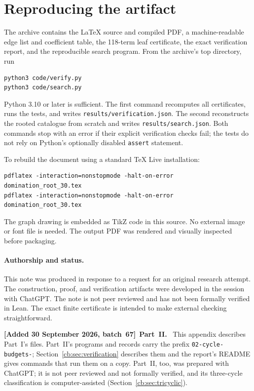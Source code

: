 \documentclass[11pt]{article}
\numberwithin{equation}{section}
\theoremstyle{definition}
\newenvironment{writenote}[1][]{\par\smallskip\begingroup\small\sloppy
 \noindent\textbf{[Added 30 September 2026, batch~67]}\if\relax\detokenize{#1}\relax\else~\textbf{#1.}\fi\ }%
 {\par\endgroup\smallskip}
\begin{document}
\appendix
\section{Reproducing the artifact}

The archive contains the \LaTeX{} source and compiled PDF, a
machine-readable edge list and coefficient table, the 118-term leaf
certificate, the exact verification report, and the reproducible
search program. From the archive's top directory, run
\begin{lstlisting}
python3 code/verify.py
python3 code/search.py
\end{lstlisting}
Python 3.10 or later is sufficient. The first command recomputes all
certificates, runs the tests, and writes
\texttt{results/verification.json}. The second reconstructs the rooted
catalogue from scratch and writes \texttt{results/search.json}.
Both commands stop with an error if their explicit verification checks
fail; the tests do not rely on Python's optionally disabled
\texttt{assert} statement.

To rebuild the document using a standard TeX Live installation:
\begin{lstlisting}
pdflatex -interaction=nonstopmode -halt-on-error domination_root_30.tex
pdflatex -interaction=nonstopmode -halt-on-error domination_root_30.tex
\end{lstlisting}
The graph drawing is embedded as TikZ code in this source. No external
image or font file is needed. The output PDF was rendered and visually
inspected before packaging.

\paragraph{Authorship and status.}
This note was produced in response to a request for an original
research attempt. The construction, proof, and verification artifacts
were developed in the session with ChatGPT. The note is not peer
reviewed and has not been formally verified in Lean. The exact finite
certificate is intended to make external checking straightforward.

\begin{writenote}[Part~II]
This appendix describes Part~I's files. Part~II's programs and records
carry the prefix \texttt{02-cycle-budgets-}; Section~\ref{cb:sec:verification}
describes them and the report's README gives commands that run them on a
copy. Part~II, too, was prepared with ChatGPT; it is not peer reviewed and
not formally verified, and its three-cycle classification is
computer-assisted (Section~\ref{cb:sec:tricyclic}).
\end{writenote}
\end{document}
